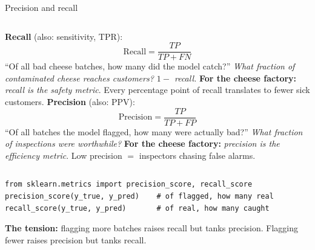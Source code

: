 \documentclass[aspectratio=169]{beamer}
\begin{document}
\begin{frame}[fragile]{Precision and recall}
  \begin{columns}[T]
    \textbf{Recall} (also: sensitivity, TPR):
    \[
      \text{Recall} = \frac{TP}{TP + FN}
    \]
    \footnotesize ``Of all bad cheese batches, how many did the model catch?'' \emph{What fraction of contaminated cheese reaches customers? $1 - $ recall.}
    \vskip 6pt
    \textbf{For the cheese factory:} \emph{recall is the safety metric}. Every percentage point of recall translates to fewer sick customers.
    \textbf{Precision} (also: PPV):
    \[
      \text{Precision} = \frac{TP}{TP + FP}
    \]
    \footnotesize ``Of all batches the model flagged, how many were actually bad?'' \emph{What fraction of inspections were worthwhile?}
    \vskip 6pt
    \textbf{For the cheese factory:} \emph{precision is the efficiency metric}. Low precision $=$ inspectors chasing false alarms.
  \end{columns}
  \vfill
{\lstset{basicstyle=\ttfamily\scriptsize}
\begin{lstlisting}
from sklearn.metrics import precision_score, recall_score
precision_score(y_true, y_pred)    # of flagged, how many real
recall_score(y_true, y_pred)       # of real, how many caught
\end{lstlisting}}
  \vfill
  \footnotesize \textbf{The tension:} flagging more batches raises recall but tanks precision. Flagging fewer raises precision but tanks recall.
\end{frame}
\end{document}
